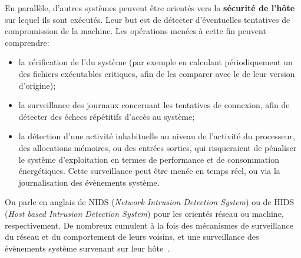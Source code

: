 En parallèle, d'autres systèmes peuvent être orientés vers la \textbf{sécurité de l'hôte} sur lequel ils sont exécutés.
Leur but est de détecter d'éventuelles tentatives de compromission de la machine.
Les opérations menées à cette fin peuvent comprendre:
\begin{itemize}
    \item la vérification de l'\integrite du système (par exemple en calculant périodiquement un  des fichiers exécutables critiques, afin de les comparer avec le  de leur version d'origine);
    \item la surveillance des journaux concernant les tentatives de connexion, afin de détecter des échecs répétitifs d'accès au système;
    \item la détection d'une activité inhabituelle au niveau de l'activité du processeur, des allocations mémoires, ou des entrées sorties, qui risqueraient de pénaliser le système d'exploitation en termes de performance et de consommation énergétiques. Cette surveillance peut être menée en temps réel, ou via la journalisation des évènements système.
\end{itemize}
On parle en anglais de NIDS (\textit{Network Intrusion Detection System}) ou de HIDS (\textit{Host based Intrusion Detection System}) pour les \IDS orientés réseau ou machine, respectivement.
De nombreux \IDS cumulent à la fois des mécanismes de surveillance du réseau et du comportement de leurs voisins, et une surveillance des évènements système survenant sur leur hôte~\cite{BMS13}.

